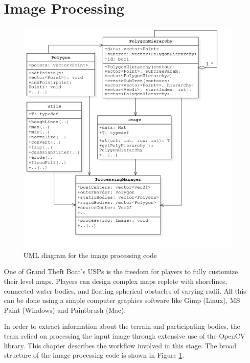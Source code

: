 \section{Image Processing}
\begin{figure}
\centering
  \includegraphics[scale=0.6]{img/ImageProcessing/UML_ImgProc_PNG.png}
\caption{UML diagram for the image processing code\label{fig:UMLImgProc}}
\end{figure}

One of Grand Theft Boat's USPs is the freedom for players to fully customize their level maps. Players can design complex maps replete with shorelines, connected water bodies, and floating spherical obstacles of varying radii. All this can be done using a simple computer graphics software like Gimp (Linux), MS Paint (Windows) and Paintbrush (Mac). 

In order to extract information about the terrain and participating bodies, the team relied on processing the input image through extensive use of the OpenCV library. This chapter describes the workflow involved in this stage. The broad structure of the image processing code is shown in Figure \ref{fig:UMLImgProc}.




